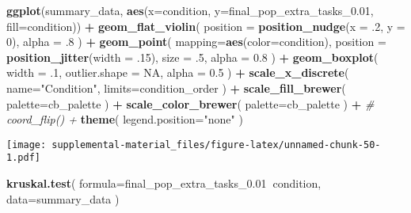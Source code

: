 \documentclass[]{book}
\newenvironment{Shaded}{\begin{snugshade}}{\end{snugshade}}
\newcommand{\CommentTok}[1]{\textcolor[rgb]{0.56,0.35,0.01}{\textit{#1}}}
\newcommand{\DataTypeTok}[1]{\textcolor[rgb]{0.13,0.29,0.53}{#1}}
\newcommand{\DecValTok}[1]{\textcolor[rgb]{0.00,0.00,0.81}{#1}}
\newcommand{\FloatTok}[1]{\textcolor[rgb]{0.00,0.00,0.81}{#1}}
\newcommand{\KeywordTok}[1]{\textcolor[rgb]{0.13,0.29,0.53}{\textbf{#1}}}
\newcommand{\NormalTok}[1]{#1}
\newcommand{\OperatorTok}[1]{\textcolor[rgb]{0.81,0.36,0.00}{\textbf{#1}}}
\newcommand{\OtherTok}[1]{\textcolor[rgb]{0.56,0.35,0.01}{#1}}
\newcommand{\StringTok}[1]{\textcolor[rgb]{0.31,0.60,0.02}{#1}}
\begin{document}
\begin{Shaded}
\begin{Highlighting}[]
\KeywordTok{ggplot}\NormalTok{(summary_data, }\KeywordTok{aes}\NormalTok{(}\DataTypeTok{x=}\NormalTok{condition, }\DataTypeTok{y=}\NormalTok{final_pop_extra_tasks_}\FloatTok{0.01}\NormalTok{, }\DataTypeTok{fill=}\NormalTok{condition)) }\OperatorTok{+}
\StringTok{  }\KeywordTok{geom_flat_violin}\NormalTok{(}
    \DataTypeTok{position =} \KeywordTok{position_nudge}\NormalTok{(}\DataTypeTok{x =} \FloatTok{.2}\NormalTok{, }\DataTypeTok{y =} \DecValTok{0}\NormalTok{),}
    \DataTypeTok{alpha =} \FloatTok{.8}
\NormalTok{  ) }\OperatorTok{+}
\StringTok{  }\KeywordTok{geom_point}\NormalTok{(}
    \DataTypeTok{mapping=}\KeywordTok{aes}\NormalTok{(}\DataTypeTok{color=}\NormalTok{condition),}
    \DataTypeTok{position =} \KeywordTok{position_jitter}\NormalTok{(}\DataTypeTok{width =} \FloatTok{.15}\NormalTok{),}
    \DataTypeTok{size =} \FloatTok{.5}\NormalTok{,}
    \DataTypeTok{alpha =} \FloatTok{0.8}
\NormalTok{  ) }\OperatorTok{+}
\StringTok{  }\KeywordTok{geom_boxplot}\NormalTok{(}
    \DataTypeTok{width =} \FloatTok{.1}\NormalTok{,}
    \DataTypeTok{outlier.shape =} \OtherTok{NA}\NormalTok{,}
    \DataTypeTok{alpha =} \FloatTok{0.5}
\NormalTok{  ) }\OperatorTok{+}
\StringTok{  }\KeywordTok{scale_x_discrete}\NormalTok{(}
    \DataTypeTok{name=}\StringTok{"Condition"}\NormalTok{,}
    \DataTypeTok{limits=}\NormalTok{condition_order}
\NormalTok{  ) }\OperatorTok{+}
\StringTok{  }\KeywordTok{scale_fill_brewer}\NormalTok{(}
    \DataTypeTok{palette=}\NormalTok{cb_palette}
\NormalTok{  ) }\OperatorTok{+}
\StringTok{  }\KeywordTok{scale_color_brewer}\NormalTok{(}
    \DataTypeTok{palette=}\NormalTok{cb_palette}
\NormalTok{  ) }\OperatorTok{+}
\StringTok{  }\CommentTok{# coord_flip() +}
\StringTok{  }\KeywordTok{theme}\NormalTok{(}
    \DataTypeTok{legend.position=}\StringTok{"none"}
\NormalTok{  )}
\end{Highlighting}
\end{Shaded}

\texttt{[image: supplemental-material\_files/figure-latex/unnamed-chunk-50-1.pdf]}

\begin{Shaded}
\begin{Highlighting}[]
\KeywordTok{kruskal.test}\NormalTok{(}
  \DataTypeTok{formula=}\NormalTok{final_pop_extra_tasks_}\FloatTok{0.01}\OperatorTok{~}\NormalTok{condition,}
  \DataTypeTok{data=}\NormalTok{summary_data}
\NormalTok{)}
\end{Highlighting}
\end{Shaded}
\end{document}
